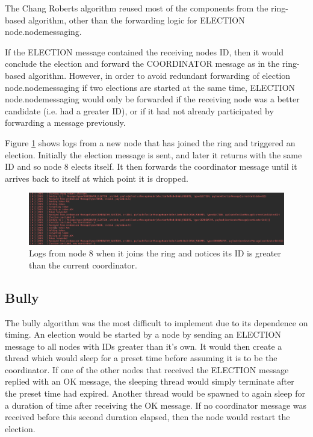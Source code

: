 \documentclass[12pt]{article}
\begin{document}
The Chang Roberts algorithm reused most of the components from the ring-based algorithm, other than the forwarding logic for ELECTION node.nodemessaging.

If the ELECTION message contained the receiving nodes ID, then it would conclude the election and forward the COORDINATOR message as in the ring-based algorithm. However, in order to avoid redundant forwarding of election node.nodemessaging if two elections are started at the same time, ELECTION node.nodemessaging would only be forwarded if the receiving node was a better candidate (i.e. had a greater ID), or if it had not already participated by forwarding a message previously.

Figure \ref{fig:chang} shows logs from a new node that has joined the ring and triggered an election. Initially the election message is sent, and later it returns with the same ID and so node 8 elects itself. It then forwards the coordinator message until it arrives back to itself at which point it is dropped.

\begin{figure}[!ht]
	\centering
	\includegraphics[width=\linewidth]{images/chang}
	\caption{Logs from node 8 when it joins the ring and notices its ID is greater than the current coordinator.}
	\label{fig:chang}
\end{figure}

\subsection{Bully}

The bully algorithm was the most difficult to implement due to its dependence on timing. An election would be started by a node by sending an ELECTION message to all nodes with IDs greater than it's own. It would then create a thread which would sleep for a preset time before assuming it is to be the coordinator. If one of the other nodes that received the ELECTION message replied with an OK message, the sleeping thread would simply terminate after the preset time had expired. Another thread would be spawned to again sleep for a duration of time after receiving the OK message. If no coordinator message was received before this second duration elapsed, then the node would restart the election.
\end{document}
